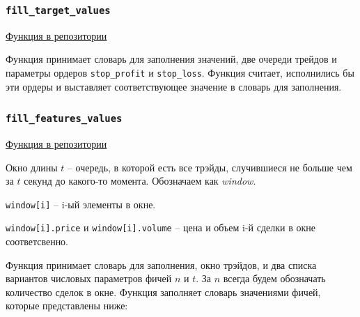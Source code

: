 \subsubsection{\texttt{fill\_target\_values}}
\href{https://github.com/dexety/dex-trading-system/blob/ca0370d602f2dfa05262b9b8574002f965ac1502/utils/indicators.py#L15}{Функция в репозитории}

Функция принимает словарь для заполнения значений, две очереди трейдов и параметры ордеров \texttt{stop\_profit} и \texttt{stop\_loss}. Функция считает, исполнились бы эти ордеры и выставляет соответствующее значение в словарь для заполнения.

\subsubsection{\texttt{fill\_features\_values}}
\href{https://github.com/dexety/dex-trading-system/blob/ca0370d602f2dfa05262b9b8574002f965ac1502/utils/indicators.py#L48}{Функция в репозитории}

\begin{designation}
Окно длины $t$ -- очередь, в которой есть все трэйды, случившиеся не больше чем за $t$ секунд до какого-то момента. Обозначаем как \textit{window}.
\end{designation}

\begin{designation}
    \texttt{window[i]} -- i-ый элементы в окне.
\end{designation}
\begin{designation}
    \texttt{window[i].price} и \texttt{window[i].volume} -- цена и объем i-й сделки в окне соответсвенно.
\end{designation}

Функция принимает словарь для заполнения, окно трэйдов, и два списка вариантов числовых параметров фичей $n$ и $t$. За $n$ всегда будем обозначать количество сделок в окне. Функция заполняет словарь значениями фичей, которые представлены ниже:

